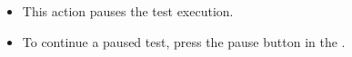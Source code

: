 \begin{itemize}
\item This action pauses the test execution.
\item To continue a paused test, press the pause button in the \ite{}.
\end{itemize}
